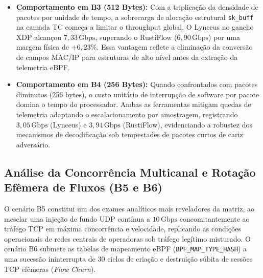 \documentclass[11pt,a4paper]{article}
\begin{document}
\begin{itemize}
    \item \textbf{Comportamento em B3 (512 Bytes):} Com a triplicação da densidade de pacotes por unidade de tempo, a sobrecarga de alocação estrutural \texttt{sk\_buff} na camada TC começa a limitar o throughput global. O Lynceus no gancho XDP alcançou $7,33\,\text{Gbps}$, superando o RustiFlow ($6,90\,\text{Gbps}$) por uma margem física de \textbf{$+6,23\%$}. Essa vantagem reflete a eliminação da conversão de campos MAC/IP para estruturas de alto nível antes da extração da telemetria eBPF.
    \item \textbf{Comportamento em B4 (256 Bytes):} Quando confrontados com pacotes diminutos (256 bytes), o custo unitário de interrupção de software por pacote domina o tempo do processador. Ambas as ferramentas mitigam quedas de telemetria adaptando o escalacionamento por amostragem, registrando $3,05\,\text{Gbps}$ (Lynceus) e $3,94\,\text{Gbps}$ (RustiFlow), evidenciando a robustez dos mecanismos de decodificação sob tempestades de pacotes curtos de cariz adversário.
\end{itemize}

\subsection{Análise da Concorrência Multicanal e Rotação Efêmera de Fluxos (B5 e B6)}
O cenário B5 constitui um dos exames analíticos mais reveladores da matriz, ao mesclar uma injeção de fundo UDP contínua a $10\,\text{Gbps}$ concomitantemente ao tráfego TCP em máxima concorrência e velocidade, replicando as condições operacionais de redes centrais de operadoras sob tráfego legítimo misturado. O cenário B6 submete as tabelas de mapeamento eBPF (\texttt{BPF\_MAP\_TYPE\_HASH}) a uma sucessão ininterrupta de 30 ciclos de criação e destruição súbita de sessões TCP efêmeras (\textit{Flow Churn}).
\end{document}
